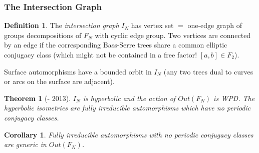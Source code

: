 \documentclass{beamer}
\theoremstyle{theorem}
\newtheorem{thm}{Theorem}
\newtheorem{cor}{Corollary}
\theoremstyle{definition}
\newtheorem*{defin}{Definition}
\renewcommand{\-}{\ensuremath{^{-1}}}
\renewcommand{\>}{\ensuremath{\rightarrow}}
\renewcommand{\(}{\langle}
\renewcommand{\)}{\rangle}
\begin{document}
\begin{frame}
\frametitle{The Intersection Graph}
\begin{defin}
The \emph{intersection graph} $I_N$ has vertex set $=$ one-edge graph of groups decompositions of $F_N$ with cyclic edge group. Two vertices are connected by an edge if the corresponding Bass-Serre trees share a common elliptic conjugacy class (which might not be contained in a free factor! $[a,b] \in F_2$). 
\end{defin}
\pause
Surface automorphisms have a bounded orbit in $I_N$ (any two trees dual to curves or arcs on the surface are adjacent). 
\pause
\begin{thm}[- 2013]
$I_N$ is hyperbolic and the action of $Out(F_N)$ is WPD. The hyperbolic isometries are fully irreducible automorphisms which have no periodic conjugacy classes.
\end{thm}
\end{frame}
\begin{frame}

\begin{cor}
Fully irreducible automorphisms with no periodic conjugacy classes are generic in $Out(F_N)$.
\end{cor}
\end{frame}



\end{document}

